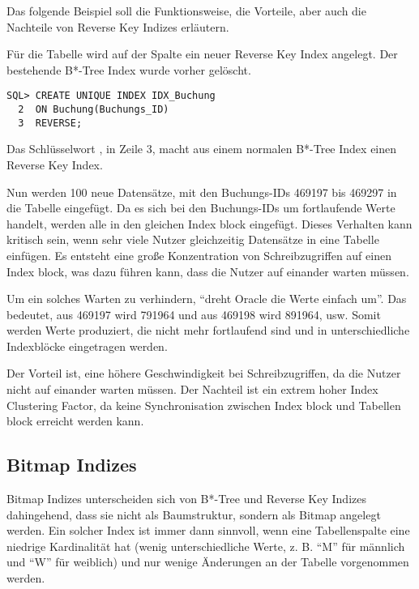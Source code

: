         Das folgende Beispiel soll die Funktionsweise, die Vorteile, aber auch die Nachteile von Reverse Key Indizes erl\"autern.

        F\"ur die Tabelle  wird auf der Spalte  ein neuer Reverse Key Index angelegt. Der bestehende B*-Tree Index wurde vorher gel\"oscht.
        \begin{lstlisting}[caption={Einen Reverse Key Index anlegen},label=admin320,language=oracle_sql]
SQL> CREATE UNIQUE INDEX IDX_Buchung
  2  ON Buchung(Buchungs_ID)
  3  REVERSE;
        \end{lstlisting}
        \begin{merke}
          Das Schl\"usselwort , in Zeile 3, macht aus einem normalen B*-Tree Index einen Reverse Key Index.
        \end{merke}
\clearpage
        Nun werden 100 neue Datens\"atze, mit den Buchungs-IDs 469197 bis 469297 in die Tabelle eingef\"ugt. Da es sich bei den Buchungs-IDs um fortlaufende Werte handelt, werden alle in den gleichen Index block eingef\"ugt. Dieses Verhalten kann kritisch sein, wenn sehr viele Nutzer gleichzeitig Datens\"atze in eine Tabelle einf\"ugen. Es entsteht eine gro\ss{}e Konzentration von Schreibzugriffen auf einen Index block, was dazu f\"uhren kann, dass die Nutzer auf einander warten m\"ussen.

        Um ein solches Warten zu verhindern, \enquote{dreht Oracle die Werte einfach um}. Das bedeutet, aus 469197 wird 791964 und aus 469198 wird 891964, usw. Somit werden Werte produziert, die nicht mehr fortlaufend sind und in unterschiedliche Indexbl\"ocke eingetragen werden.

        Der Vorteil ist, eine h\"ohere Geschwindigkeit bei Schreibzugriffen, da die Nutzer nicht auf einander warten m\"ussen. Der Nachteil ist ein extrem hoher Index Clustering Factor, da keine Synchronisation zwischen Index block und Tabellen block erreicht werden kann.
      \subsection{Bitmap Indizes}
        Bitmap Indizes unterscheiden sich von B*-Tree und Reverse Key Indizes dahingehend, dass sie nicht als Baumstruktur, sondern als Bitmap angelegt werden. Ein solcher Index ist immer dann sinnvoll, wenn eine Tabellenspalte eine niedrige Kardinalit\"at hat (wenig unterschiedliche Werte, z. B. \enquote{M} f\"ur m\"annlich und \enquote{W} f\"ur weiblich) und nur wenige \"Anderungen an der Tabelle vorgenommen werden.

